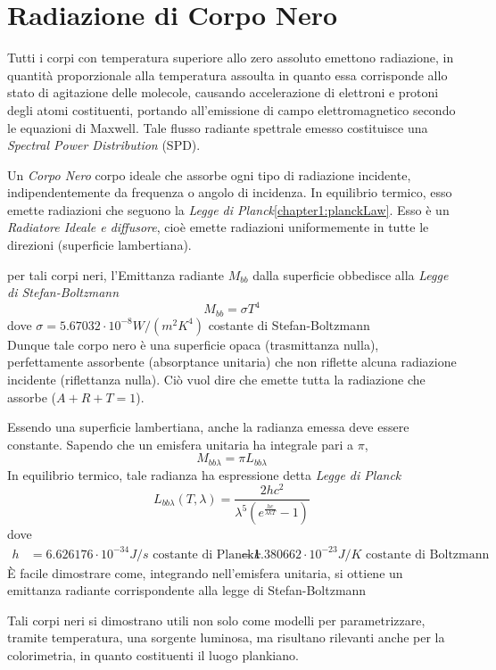 \section{Radiazione di Corpo Nero}
Tutti i corpi con temperatura superiore allo zero assoluto emettono radiazione, in quantit\`a proporzionale alla temperatura assoulta in quanto essa 
corrisponde allo stato di agitazione delle molecole, causando accelerazione di elettroni e protoni degli atomi costituenti, portando all'emissione 
di campo elettromagnetico secondo le equazioni di Maxwell. Tale flusso radiante spettrale emesso costituisce una \textit{Spectral Power Distribution}
(SPD). \par
Un \textit{Corpo Nero} corpo ideale che assorbe ogni tipo di radiazione incidente, indipendentemente da frequenza o angolo di incidenza. In
equilibrio termico, esso emette radiazioni che seguono la \textit{Legge di Planck}\ref{chapter1:planckLaw}. Esso \`e un 
\textit{Radiatore Ideale e diffusore}, cio\`e emette radiazioni uniformemente in tutte le direzioni (superficie lambertiana).\par
per tali corpi neri, l'Emittanza radiante $M_{bb}$ dalla superficie obbedisce alla \textit{Legge di Stefan-Boltzmann}
\begin{equation}
	M_{bb} = \sigma T^4
\end{equation}
dove $\sigma = 5.67032\cdot 10^{-8} \si{W/(m^2 K^4)}$ costante di Stefan-Boltzmann\\
Dunque tale corpo nero \`e una superficie opaca (trasmittanza nulla), perfettamente assorbente (absorptance unitaria) che non riflette alcuna radiazione
incidente (riflettanza nulla). Ci\`o vuol dire che emette tutta la radiazione che assorbe ($A+R+T=1$).\par
Essendo una superficie lambertiana, anche la radianza emessa deve essere constante. Sapendo che un emisfera unitaria ha integrale pari a $\pi$,
\begin{equation}
	M_{bb\lambda} = \pi L_{bb\lambda}
\end{equation}
In equilibrio termico, tale radianza ha espressione detta \textit{Legge di Planck}
\begin{equation}\label{chapter1:planckLaw}
	L_{bb\lambda}(T,\lambda) = \frac{2hc^2}{\lambda^5\left(e^{\frac{hc}{\lambda kT}}-1\right)}
\end{equation}
dove
\begin{align}
	h &= 6.626176\cdot 10^{-34} \si{J/s}\text{ costante di Planck}
	k &= 1.380662\cdot 10^{-23} \si{J/K}\text{ costante di Boltzmann}
\end{align}
\`E facile dimostrare come, integrando nell'emisfera unitaria, si ottiene un emittanza radiante corrispondente alla legge di Stefan-Boltzmann\par
Tali corpi neri si dimostrano utili non solo come modelli per parametrizzare, tramite temperatura, una sorgente luminosa, ma risultano rilevanti 
anche per la colorimetria, in quanto costituenti il luogo plankiano.\par
